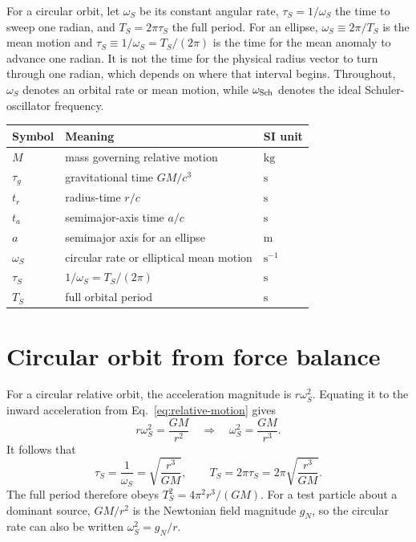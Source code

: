 \documentclass[12pt]{article}
\begin{document}
For a circular orbit, let $\omega_S$ be its constant angular rate, $\tau_S=1/\omega_S$ the time to sweep one radian, and $T_S=2\pi\tau_S$ the full period. For an ellipse, $\omega_S\equiv2\pi/T_S$ is the mean motion and $\tau_S\equiv1/\omega_S=T_S/(2\pi)$ is the time for the mean anomaly to advance one radian. It is not the time for the physical radius vector to turn through one radian, which depends on where that interval begins. Throughout, $\omega_S$ denotes an orbital rate or mean motion, while $\omega_{\rm Sch}$ denotes the ideal Schuler-oscillator frequency.

\begin{center}
\small
\begin{tabular}{@{}lll@{}}
  \toprule
  Symbol & Meaning & SI unit \\
  \midrule
  $M$ & mass governing relative motion & $\mathrm{kg}$ \\
  $\tau_g$ & gravitational time $GM/c^3$ & $\mathrm{s}$ \\
  $t_r$ & radius-time $r/c$ & $\mathrm{s}$ \\
  $t_a$ & semimajor-axis time $a/c$ & $\mathrm{s}$ \\
  $a$ & semimajor axis for an ellipse & $\mathrm{m}$ \\
  $\omega_S$ & circular rate or elliptical mean motion & $\mathrm{s^{-1}}$ \\
  $\tau_S$ & $1/\omega_S=T_S/(2\pi)$ & $\mathrm{s}$ \\
  $T_S$ & full orbital period & $\mathrm{s}$ \\
  \bottomrule
\end{tabular}
\end{center}

\section{Circular orbit from force balance}
\label{sec:circular}

For a circular relative orbit, the acceleration magnitude is $r\omega_S^2$. Equating it to the inward acceleration from Eq.~\eqref{eq:relative-motion} gives
\begin{equation}
  r\omega_S^2=\frac{GM}{r^2}
  \quad\Longrightarrow\quad
  \omega_S^2=\frac{GM}{r^3}.
  \label{eq:circular-rate}
\end{equation}
It follows that
\begin{equation}
  \tau_S=\frac{1}{\omega_S}
  =\sqrt{\frac{r^3}{GM}},
  \qquad
  T_S=2\pi\tau_S
  =2\pi\sqrt{\frac{r^3}{GM}}.
  \label{eq:circular-period}
\end{equation}
The full period therefore obeys $T_S^2=4\pi^2r^3/(GM)$. For a test particle about a dominant source, $GM/r^2$ is the Newtonian field magnitude $g_N$, so the circular rate can also be written $\omega_S^2=g_N/r$.
\end{document}
